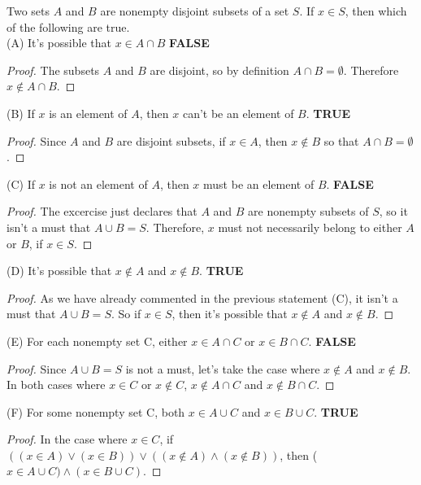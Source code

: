 \documentclass[12pt]{article}
\newenvironment{problem}[2][Problem]{\begin{trivlist}
		\item[\hskip \labelsep {\bfseries #1}\hskip \labelsep {\bfseries #2.}]}{\end{trivlist}}
\begin{document}
\begin{problem}{24}
	Two sets $A$ and $B$ are nonempty disjoint subsets of a set $S$. If $x \in S$, then which of the following are true. \\
	
(A) It's possible that $x \in A \cap B$ \textbf{ FALSE}
\begin{proof}
	The subsets $A$ and $B$ are disjoint, so by definition $A\cap B = \emptyset$. Therefore $x \notin A\cap B$.
\end{proof}
(B) If $x$ is an element of $A$, then $x$ can't be an element of $B$. \textbf{ TRUE}
\begin{proof}
	Since $A$ and $B$ are disjoint subsets, if $x \in A$, then $x \notin B$ so that $A \cap B = \emptyset$. 
\end{proof}
(C) If $x$ is not an element of $A$, then $x$ must be an element of $B$. \textbf{ FALSE}
\begin{proof}
	The excercise just declares that $A$ and $B$ are nonempty subsets of $S$, so it isn't a must that $A \cup B = S$. Therefore, $x$ must not necessarily belong to either $A$ or $B$, if $x \in S$.
\end{proof}
(D) It's possible that $x \notin A$ and $x \notin B$. \textbf{ TRUE}
\begin{proof}
	As we have already commented in the previous statement (C), it isn't a must that $A \cup B = S$. So if $x \in S$, then it's possible that $x \notin A$ and $x \notin B$.
\end{proof}
(E) For each nonempty set C, either $x \in A\cap C$ or $x \in B\cap C$. \textbf{ FALSE}
\begin{proof}
	Since $A \cup B = S$ is not a must, let's take the case where $x \notin A$ and $x \notin B$. In both cases where $x \in C$ or $x \notin C$, $x \notin A\cap C$ and $x \notin B\cap C$. 
\end{proof}
(F) For some nonempty set C, both $x \in A\cup C$ and $x \in B\cup C$. \textbf{ TRUE} 
\begin{proof}
	In the case where $x \in C$, if $((x \in A) \vee (x \in B)) \vee ((x\notin A) \wedge (x\notin B))$, then ($x \in A\cup C) \wedge (x \in B\cup C)$.
\end{proof}
\end{problem}
\end{document}

